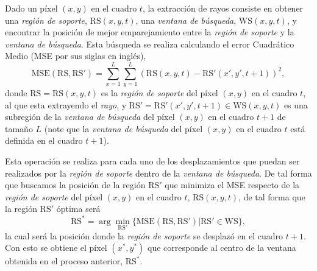 	Dado un píxel $(x,y)$ en el cuadro $t$, la extracción de rayos consiste en obtener una \textit{región de soporte}, $\text{RS}(x,y,t)$, una \textit{ventana de búsqueda}, $\text{WS}(x,y,t)$, y encontrar la posición de mejor emparejamiento entre la \textit{región de soporte} y la \textit{ventana de búsqueda}. Esta búsqueda se realiza calculando el error Cuadrático Medio (MSE por sus siglas en inglés), \begin{equation}\label{algoritmo:eq:mse}	
			\text{MSE}(\text{RS}, \text{RS}') = \sum_{x=1}^{L} \sum_{y=1}^{L} (\text{RS}(x,y,t) - \text{RS}'(x',y', t+1))^2,
		\end{equation} 
	donde $\text{RS} = \text{RS}(x,y,t)$ es la \textit{región de soporte} del píxel $(x,y)$ en el cuadro $t$, al que esta extrayendo el \textit{rayo}, y $\text{RS}' = \text{RS}'(x',y',t+1) \in \text{WS}(x,y,t)$ es una subregión de la \textit{ventana de búsqueda} del píxel $(x,y)$ en el cuadro $t+1$ de tamaño $L$ (note que la \textit{ventana de búsqueda} del píxel $(x,y)$ en el cuadro $t$ está definida en el cuadro $t+1$).
		
	Esta operación se realiza para cada uno de los desplazamientos que puedan ser realizados por la \textit{región de soporte} dentro de la \textit{ventana de búsqueda}. De tal forma que buscamos la posición de la región $\text{RS}'$ que minimiza el MSE respecto de la \textit{región de soporte} del píxel $(x,y)$ en el cuadro $t$, $\text{RS}(x,y,t)$, de tal forma que la región $\text{RS}'$ óptima será
	\begin{equation}
		\text{RS}^* = \arg \min_{\text{RS}'}\{\text{MSE}(\text{RS},\text{RS}') | \text{RS}' \in \text{WS} \},
	\end{equation}		
	la cual será la posición donde la \textit{región de soporte} se desplazó en el cuadro $t+1$. Con esto se obtiene el píxel $(x^*,y^*)$ que corresponde al centro de la ventana obtenida en el proceso anterior, $\text{RS}^*$.
	

